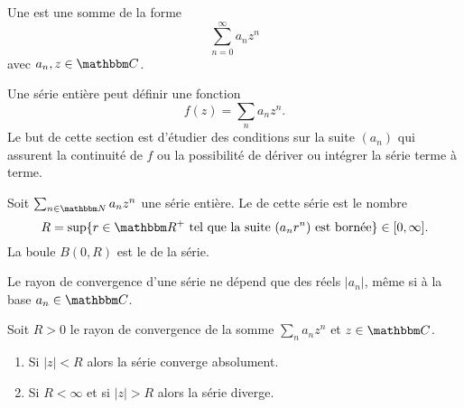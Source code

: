 \begin{definition}
    Une  est une somme de la forme
    \begin{equation}
        \sum_{n=0}^{\infty}a_nz^n
    \end{equation}
    avec \( a_n,z\in\eC\).    
\end{definition}
Une série entière peut définir une fonction
\begin{equation}
    f(z)=\sum_na_nz^n.
\end{equation}
Le but de cette section est d'étudier des conditions sur la suite \( (a_n)\) qui assurent la continuité de \( f\) ou la possibilité de dériver ou intégrer la série terme à terme.

\begin{definition}  \label{DefZWKOZOl}
    Soit \( \sum_{n\in \eN}a_nz^n\) une série entière. Le  de cette série est le nombre
    \begin{equation}
        R=\sup\{ r\in \eR^+\tq \text{la suite \((a_nr^n)\) est bornée} \}\in\mathopen[ 0 , \infty \mathclose].
    \end{equation}
    La boule \( B(0,R)\) est le  de la série.
\end{definition}
Le rayon de convergence d'une série ne dépend que des réels \( | a_n |\), même si à la base \( a_n\in \eC\).

\begin{lemma}   \label{LemmbWnFI}
    Soit \( R>0\) le rayon de convergence de la somme \( \sum_na_nz^n\) et \( z\in \eC\).
    \begin{enumerate}
        \item
            Si \( | z |<R\) alors la série converge absolument.
        \item
            Si \( R<\infty\) et si \( | z |>R\) alors la série diverge.
    \end{enumerate}
\end{lemma}


